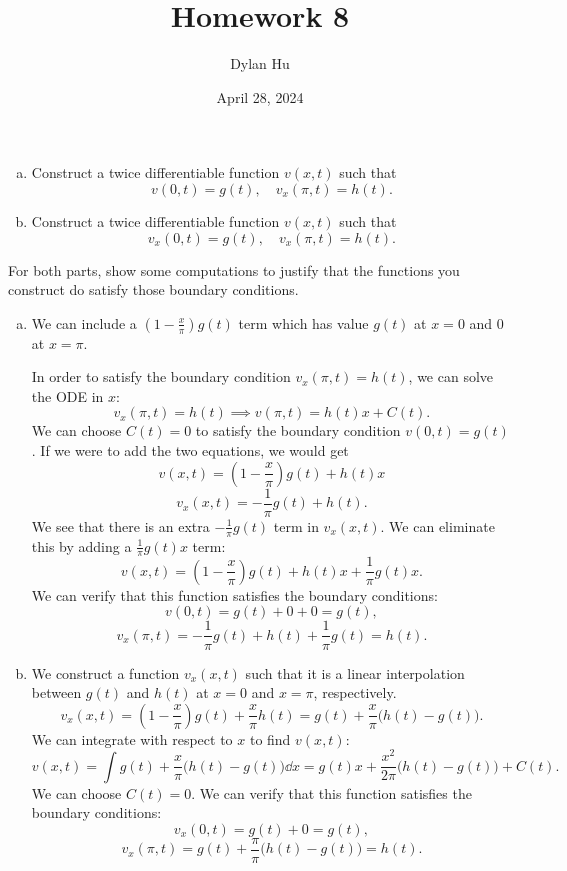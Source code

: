 \documentclass[plain]{pset}
\title{Homework 8}
\author{Dylan Hu}
\date{April 28, 2024}
\begin{document}
\maketitle

\pagebreak

\begin{problem}
\leavevmode
\begin{enumerate}[(a)]
    \item Construct a twice differentiable function \(v(x,t)\) such that
          \[v(0,t) = g(t), \quad v_x(\pi, t) = h(t).\]
    \item Construct a twice differentiable function \(v(x,t)\) such that
          \[v_x(0,t) = g(t), \quad v_x(\pi, t) = h(t).\]
\end{enumerate}
For both parts, show some computations to justify that the functions you construct do
satisfy those boundary conditions.
\end{problem}
\begin{solution}
    \leavevmode
    \begin{enumerate}[(a)]
        \item We can include a \(\left(1 - \frac{x}{\pi}\right)g(t)\) term which has value \(g(t)\) at \(x = 0\) and \(0\) at \(x = \pi\).

              In order to satisfy the boundary condition \(v_x(\pi, t) = h(t)\), we can solve the ODE in \(x\):
              \[v_x(\pi, t) = h(t) \implies v(\pi, t) = h(t)x + C(t).\]
              We can choose \(C(t) = 0\) to satisfy the boundary condition \(v(0,t) = g(t)\).
              If we were to add the two equations, we would get
              \[v(x,t) = \left(1 - \frac{x}{\pi}\right)g(t) + h(t)x\]
              \[v_x(x,t) = -\frac{1}{\pi}g(t) + h(t).\]
              We see that there is an extra \(-\frac{1}{\pi}g(t)\) term in \(v_x(x,t)\). We can eliminate this by adding a \(\frac{1}{\pi}g(t)x\) term:
              \[v(x,t) = \left(1 - \frac{x}{\pi}\right)g(t) + h(t)x + \frac{1}{\pi}g(t)x.\]
              We can verify that this function satisfies the boundary conditions:
              \[v(0,t) = g(t) + 0 + 0 = g(t),\]
              \[v_x(\pi, t) = -\frac{1}{\pi}g(t) + h(t) + \frac{1}{\pi}g(t) = h(t).\]


        \item We construct a function \(v_x(x,t)\) such that it is a linear interpolation between \(g(t)\) and \(h(t)\) at \(x = 0\) and \(x = \pi\), respectively.
              \[v_x(x,t) = \left(1 - \frac{x}{\pi}\right)g(t) + \frac{x}{\pi}h(t) = g(t) + \frac{x}{\pi}\bigl(h(t) - g(t)\bigr).\]
              We can integrate with respect to \(x\) to find \(v(x,t)\):
              \[v(x,t) = \int g(t) + \frac{x}{\pi}\bigl(h(t) - g(t)\bigr) \dd{x} = g(t)x + \frac{x^2}{2\pi}\bigl(h(t) - g(t)\bigr) + C(t).\]
              We can choose \(C(t) = 0\).
              We can verify that this function satisfies the boundary conditions:
              \[v_x(0,t) = g(t) + 0 = g(t),\]
              \[v_x(\pi, t) = g(t) + \frac{\pi}{\pi}\bigl(h(t) - g(t)\bigr) = h(t).\]

    \end{enumerate}
\end{solution}
\end{document}

